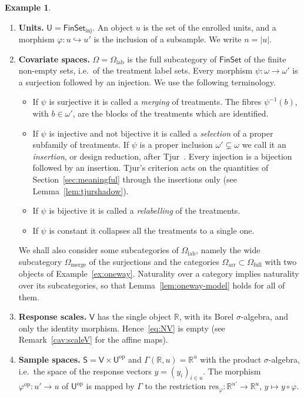 \documentclass[11pt,a4paper]{article}
\theoremstyle{plain}
\theoremstyle{definition}
\newtheorem{example}[theorem]{Example}
\theoremstyle{remark}
\newcommand{\cat}[1]{\mathsf{#1}}
\newcommand{\catU}{\cat{U}}
\newcommand{\catV}{\cat{V}}
\newcommand{\catO}{\cat{\Omega}}
\newcommand{\catS}{\cat{S}}
\newcommand{\FinSet}{\cat{FinSet}}
\newcommand{\op}{\mathrm{op}}
\newcommand{\R}{\mathbb{R}}
\newcommand{\res}{\mathrm{res}}
\begin{document}
\begin{example}\label{ex:oneway-setup}
\leavevmode
\begin{enumerate}
\item \textbf{Units.} $\catU = \FinSet_{\mathrm{inj}}$. An object $u$ is the
set of the enrolled units, and a morphism
$\varphi \colon u \hookrightarrow u'$ is the inclusion of a subsample. We write
$n = |u|$.

\item \textbf{Covariate spaces.} $\catO = \catO_{\mathrm{lab}}$ is the full
subcategory of $\FinSet$ of the finite non-empty sets, i.e.\ of the treatment
label sets. Every morphism $\psi \colon \omega \to \omega'$ is a surjection
followed by an injection. We use the following terminology.
\begin{itemize}
\item If $\psi$ is surjective it is called a \emph{merging} of treatments. The
fibres $\psi^{-1}(b)$, with $b \in \omega'$, are the blocks of the treatments
which are identified.
\item If $\psi$ is injective and not bijective it is called a \emph{selection}
of a proper subfamily of treatments. If $\psi$ is a proper inclusion
$\omega' \subsetneq \omega$ we call it an \emph{insertion}, or design
reduction, after Tjur~\cite[p.~1299]{tjur_discussion_2002}. Every injection is
a bijection followed by an insertion. Tjur's criterion acts on the quantities
of Section~\ref{sec:meaningful} through the insertions only (see
Lemma~\ref{lem:tjurshadow}).
\item If $\psi$ is bijective it is called a \emph{relabelling} of the
treatments.
\item If $\psi$ is constant it collapses all the treatments to a single one.
\end{itemize}
We shall also consider some subcategories of $\catO_{\mathrm{lab}}$, namely the
wide subcategory $\catO_{\mathrm{merge}}$ of the surjections and the
categories $\catO_{\mathrm{arr}} \subset \catO_{\mathrm{full}}$ with two
objects of Example~\ref{ex:oneway}. Naturality over a category implies
naturality over its subcategories, so that Lemma~\ref{lem:oneway-model} holds
for all of them.

\item \textbf{Response scales.} $\catV$ has the single object $\R$, with its
Borel $\sigma$-algebra, and only the identity morphism. Hence~\eqref{eq:NV} is
empty (see Remark~\ref{cav:scaleV} for the affine maps).

\item \textbf{Sample spaces.} $\catS = \catV \times \catU^{\op}$ and
$\Gamma(\R,u) = \R^{u}$ with the product $\sigma$-algebra, i.e.\ the space of
the response vectors $y = (y_i)_{i \in u}$. The morphism
$\varphi^{\op} \colon u' \to u$ of $\catU^{\op}$ is mapped by $\Gamma$ to the
restriction $\res_{\varphi} \colon \R^{u'} \to \R^{u}$,
$y \mapsto y \circ \varphi$.


\end{enumerate}
\end{example}
\end{document}
